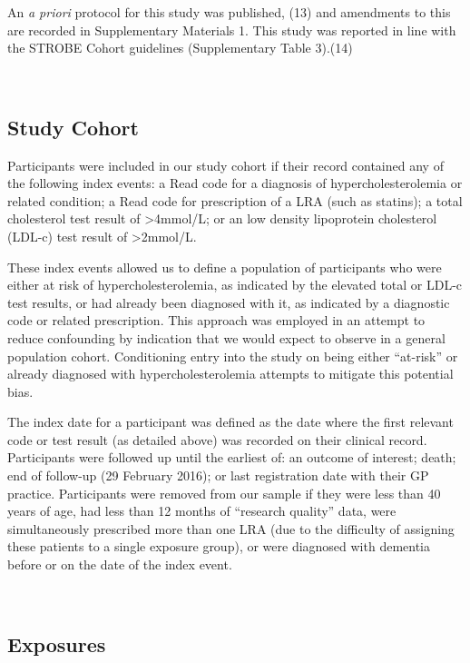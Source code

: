 \documentclass[
]{article}
\begin{document}
An \emph{a priori} protocol for this study was published, (13) and amendments to this are recorded in Supplementary Materials 1. This study was reported in line with the STROBE Cohort guidelines (Supplementary Table 3).(14)

~

\hypertarget{study-cohort}{%
\subsection{Study Cohort}\label{study-cohort}}

Participants were included in our study cohort if their record contained any of the following index events: a Read code for a diagnosis of hypercholesterolemia or related condition; a Read code for prescription of a LRA (such as statins); a total cholesterol test result of \textgreater4mmol/L; or an low density lipoprotein cholesterol (LDL-c) test result of \textgreater2mmol/L.

These index events allowed us to define a population of participants who were either at risk of hypercholesterolemia, as indicated by the elevated total or LDL-c test results, or had already been diagnosed with it, as indicated by a diagnostic code or related prescription. This approach was employed in an attempt to reduce confounding by indication that we would expect to observe in a general population cohort. Conditioning entry into the study on being either ``at-risk'' or already diagnosed with hypercholesterolemia attempts to mitigate this potential bias.

The index date for a participant was defined as the date where the first relevant code or test result (as detailed above) was recorded on their clinical record. Participants were followed up until the earliest of: an outcome of interest; death; end of follow-up (29 February 2016); or last registration date with their GP practice. Participants were removed from our sample if they were less than 40 years of age, had less than 12 months of ``research quality'' data, were simultaneously prescribed more than one LRA (due to the difficulty of assigning these patients to a single exposure group), or were diagnosed with dementia before or on the date of the index event.

~

\hypertarget{exposures}{%
\subsection{Exposures}\label{exposures}}
\end{document}
